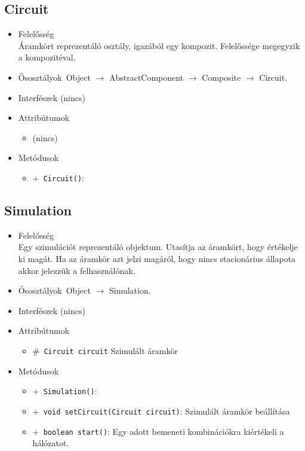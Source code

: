 \subsection{Circuit}
\begin{itemize}
\item Felelősség\\
Áramkört reprezentáló osztály, igazából egy kompozit. Felelőssége megegyzik a kompozitéval.
\item Ősosztályok\ Object $\rightarrow{}$ AbstractComponent $\rightarrow{}$ Composite $\rightarrow{}$ Circuit.
\item Interfészek (nincs)
\item Attribútumok $\ $
\begin{itemize}
\item (nincs)
\end{itemize}
\item Metódusok$\ $
\begin{itemize}
	\item[] \texttt{$+$ Circuit()}: 
\end{itemize}
\end{itemize}

\subsection{Simulation}
\begin{itemize}
\item Felelősség\\
Egy szimulációt reprezentáló objektum.  Utasítja az áramkört, hogy értékelje ki magát. Ha az áramkör azt jelzi magáról,  hogy nincs stacionárius állapota akkor jelezzük a felhasználónak.
\item Ősosztályok\ Object $\rightarrow{}$ Simulation.
\item Interfészek (nincs)
\item Attribútumok $\ $
\begin{itemize}
	\item[] \texttt{$\#$ Circuit circuit} Szimulált áramkör
\end{itemize}
\item Metódusok$\ $
\begin{itemize}
	\item[] \texttt{$+$ Simulation()}: 
	\item[] \texttt{$+$ void setCircuit(Circuit circuit)}: Szimulált áramkör beállítása
	\item[] \texttt{$+$ boolean start()}: Egy adott bemeneti kombinációkra kiértékeli a hálózatot.
\end{itemize}
\end{itemize}

